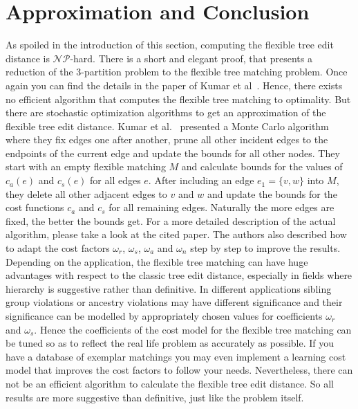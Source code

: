 \section{Approximation and Conclusion}
As spoiled in the introduction of this section, computing the flexible tree edit distance is $\mathcal{NP}$-hard. There is a short and elegant proof, that presents a reduction of the 3-partition problem to the flexible tree matching problem. Once again you can find the details in the paper of Kumar et al~\cite{Kum}. Hence, there exists no efficient algorithm that computes the flexible tree matching to optimality. But there are stochastic optimization algorithms to get an approximation of the flexible tree edit distance. Kumar et al.~\cite{Kum} presented a Monte Carlo algorithm where they fix edges one after another, prune all other incident edges to the endpoints of the current edge and update the bounds for all other nodes. They start with an empty flexible matching $M$ and calculate bounds for the values of $c_a(e)$ and $c_s(e)$ for all edges $e$. After including an edge $e_1 = \{v,w\}$ into $M$, they delete all other adjacent edges to $v$ and $w$ and update the bounds for the cost functions $c_a$ and $c_s$ for all remaining edges. Naturally the more edges are fixed, the better the bounds get. For a more detailed description of the actual algorithm, please take a look at the cited paper. The authors also described how to adapt the cost factors $\omega_r$, $\omega_s$, $\omega_a$ and $\omega_n$ step by step to improve the results.\\
Depending on the application, the flexible tree matching can have huge advantages with respect to the classic tree edit distance, especially in fields where hierarchy is suggestive rather than definitive. In different applications sibling group violations or ancestry violations may have different significance and their significance can be modelled by appropriately chosen values for coefficients $\omega_r$ and $\omega_s$. Hence the coefficients of the cost model for the flexible tree matching can be tuned so as to reflect the real life problem as accurately as possible. If you have a database of exemplar matchings you may even implement a learning cost model that improves the cost factors to follow your needs.
Nevertheless, there can not be an efficient algorithm to calculate the flexible tree edit distance. So all results are more suggestive than definitive, just like the problem itself.